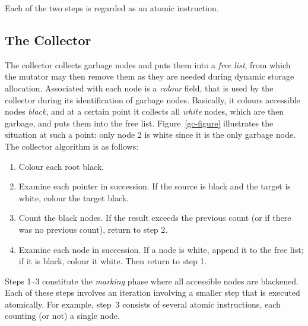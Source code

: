 \noindent Each of the two steps is regarded as an atomic instruction.


\subsection{The Collector}

The collector collects  garbage nodes and  puts
them into  a {\em free list}, from  which the  mutator may then remove
them as they are needed during dynamic storage allocation.  Associated
with each node is a {\em colour} field, that is used  by the collector
during  its  identification of garbage  nodes.  Basically,  it colours
accessible nodes {\em  black}, and at  a certain point it collects all
{\em white} nodes, which are then garbage, and puts them into the free
list. Figure~\ref{gc-figure} illustrates the situation at such a  point:
only node  2 is white since  it is the only garbage node.  The collector
algorithm is as follows:
%
\label{the-collector-informal}
\begin{enumerate}

\item Colour each root black.

\item Examine each pointer in succession. If the source is black and the
      target is white, colour the target black.

\item Count the black nodes. If the result exceeds the previous count (or
      if there was no previous count), return to step 2.

\item Examine each node in succession. If a node is white, append it to
      the free list; if it is black, colour it white. Then return to step 1.

\end{enumerate}

Steps 1--3 constitute the {\em marking}  phase where 
all accessible   nodes are blackened.  Each of these steps involves an
iteration involving a smaller step that is executed atomically.  
For example,  step~3
consists   of several atomic instructions,  each  counting (or not) a
single node.


